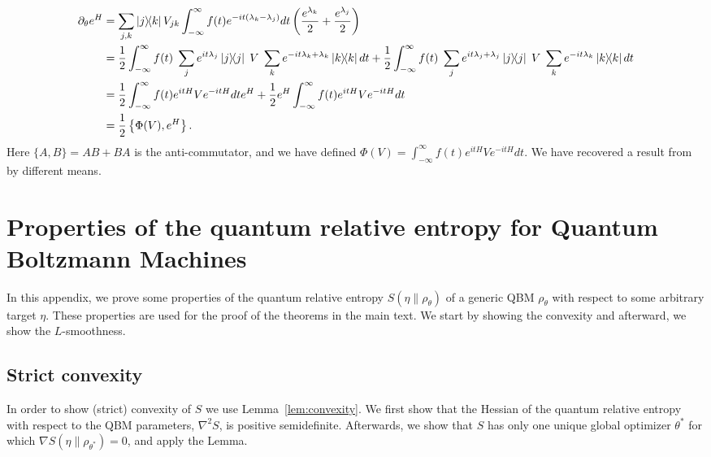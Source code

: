 \documentclass[
    aps,
    prx,
    floatfix,
    nofootinbib,
    onecolumn
]{revtex4-2}
\begin{document}
\begin{align}
\begin{split}
\label{eq:ExpDerCommutator} 
    \partial_\theta e^H &= \sum_{j,k} \ketbra{j}{k} V_{jk} \int_{-\infty}^{\infty} f(t) e^{-it(\lambda_k - \lambda_j)} dt \left( \frac{e^{\lambda_k}}{2} + \frac{e^{\lambda_j}}{2} \right) \\
    &= \frac{1}{2} \int_{-\infty}^{\infty} f(t) \; \sum_{j} e^{it\lambda_j} \dyad{j} \; V \; \sum_{k} e^{-it\lambda_k + \lambda_k} \dyad{k} dt + \frac{1}{2}\int_{-\infty}^{\infty} f(t) \; \sum_{j} e^{it\lambda_j + \lambda_j} \dyad{j} \; V \; \sum_{k} e^{-it\lambda_k} \dyad{k} dt \\
    &= \frac{1}{2} \int_{-\infty}^{\infty} f(t) e^{itH} V e^{-itH} dt e^{H} + \frac{1}{2} e^H \int_{-\infty}^{\infty} f(t) e^{itH} V e^{-itH} dt  \\
    &= \frac{1}{2} \left\{ \Phi(V) , e^H\right\} .
\end{split}
\end{align}
Here $\{A, B\} = AB + BA$ is the anti-commutator, and we have defined $\Phi(V) = \int_{-\infty}^{\infty} f(t) e^{itH} V e^{-itH} dt$. We have recovered a result from~\cite{Hastings_2007} by different means.


\section{Properties of the quantum relative entropy for Quantum Boltzmann Machines}
\label{app:relentrop}

In this appendix, we prove some properties of the quantum relative entropy $S(\eta \|\rho_\theta)$ of a generic QBM $\rho_\theta$ with respect to some arbitrary target $\eta$. These properties are used for the proof of the theorems in the main text. We start by showing the convexity and afterward, we show the $L$-smoothness. 

\subsection{Strict convexity} 
\label{app:strict_conv}

In order to show (strict) convexity of $S$ we use Lemma~\ref{lem:convexity}. We first show that the Hessian of the quantum relative entropy with respect to the QBM parameters, $\nabla^2 S$, is positive semidefinite. Afterwards, we show that $S$ has only one unique global optimizer $\theta^*$ for which $\nabla S(\eta \|\rho_{\theta^*})=0$, and apply the Lemma. 
\end{document}
